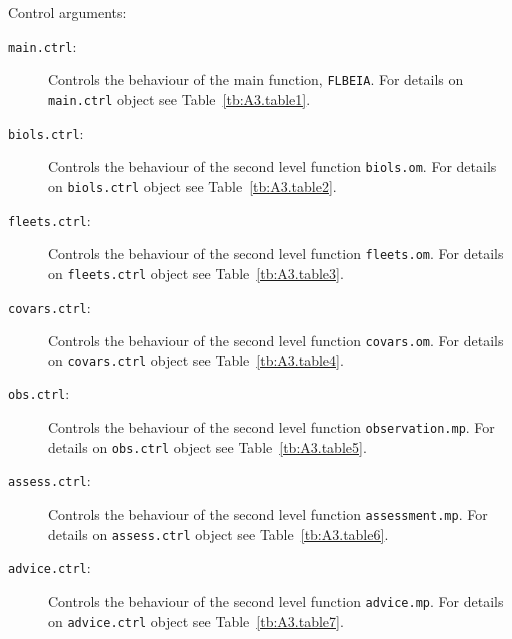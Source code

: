    
\noindent Control arguments:
\begin{description}
	\item[\texttt{main.ctrl}:]   Controls the behaviour of the main function, \texttt{FLBEIA}. 
	    For details on \texttt{main.ctrl} object see Table~\ref{tb:A3.table1}. 
	\item[\texttt{biols.ctrl}:]  Controls the behaviour of the second level function \texttt{biols.om}. 
	    For details on \texttt{biols.ctrl} object see Table~\ref{tb:A3.table2}.
	\item[\texttt{fleets.ctrl}:] Controls the behaviour of the second level function \texttt{fleets.om}. 
	    For details on \texttt{fleets.ctrl} object see Table~\ref{tb:A3.table3}.
	\item[\texttt{covars.ctrl}:] Controls the behaviour of the second level function \texttt{covars.om}. 
	    For details on \texttt{covars.ctrl} object see Table~\ref{tb:A3.table4}.
	\item[\texttt{obs.ctrl}:]    Controls the behaviour of the second level function \texttt{observation.mp}. 
	    For details on \texttt{obs.ctrl} object see Table~\ref{tb:A3.table5}.
	\item[\texttt{assess.ctrl}:] Controls the behaviour of the second level function \texttt{assessment.mp}. 
	    For details on \texttt{assess.ctrl} object see Table~\ref{tb:A3.table6}.
	\item[\texttt{advice.ctrl}:] Controls the behaviour of the second level function \texttt{advice.mp}. 
	    For details on \texttt{advice.ctrl} object see Table~\ref{tb:A3.table7}.
\end{description}
